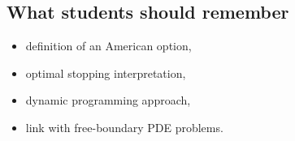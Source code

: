 \documentclass[11pt]{article}
\theoremstyle{definition}
\theoremstyle{plain}
\begin{document}
\subsection{What students should remember}

\begin{itemize}[leftmargin=1.4em]
\item definition of an American option,
\item optimal stopping interpretation,
\item dynamic programming approach,
\item link with free-boundary PDE problems.
\end{itemize}
\end{document}
